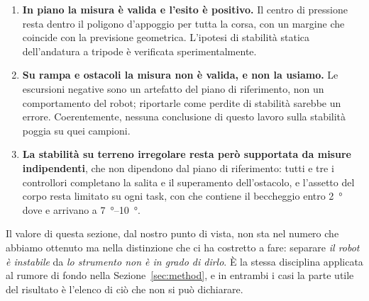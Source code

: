 \begin{enumerate}
\item \textbf{In piano la misura è valida e l'esito è positivo.} Il centro di
pressione resta dentro il poligono d'appoggio per tutta la corsa, con un
margine che coincide con la previsione geometrica. L'ipotesi di stabilità
statica dell'andatura a tripode è verificata sperimentalmente.

\item \textbf{Su rampa e ostacoli la misura non è valida, e non la usiamo.}
Le escursioni negative sono un artefatto del piano di riferimento, non un
comportamento del robot; riportarle come perdite di stabilità sarebbe un
errore. Coerentemente, nessuna conclusione di questo lavoro sulla stabilità
poggia su quei campioni.

\item \textbf{La stabilità su terreno irregolare resta però supportata da
misure indipendenti}, che non dipendono dal piano di riferimento: tutti e tre
i controllori completano la salita e il superamento dell'ostacolo, e l'assetto
del corpo resta limitato su ogni task, con \Cth{} che contiene il beccheggio
entro \SI{2}{\degree} dove \Co{} e \Ct{} arrivano a \SIrange{7}{10}{\degree}.
\end{enumerate}

Il valore di questa sezione, dal nostro punto di vista, non sta nel numero che
abbiamo ottenuto ma nella distinzione che ci ha costretto a fare: separare
\emph{il robot è instabile} da \emph{lo strumento non è in grado di dirlo}. È
la stessa disciplina applicata al rumore di fondo nella
Sezione~\ref{sec:method}, e in entrambi i casi la parte utile del risultato è
l'elenco di ciò che non si può dichiarare.
